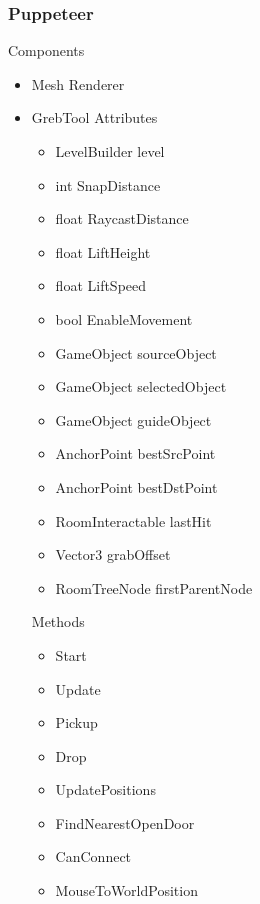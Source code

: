 \documentclass[11pt]{article}
\begin{document}
\subsubsection{Puppeteer}
Components
\begin{itemize}
	\item Mesh Renderer
	\item GrebTool
	\newline Attributes
	\begin{itemize}
		\item LevelBuilder level
		\item int SnapDistance
		\item float RaycastDistance
		\item float LiftHeight
		\item float LiftSpeed
		\item bool EnableMovement
		\item GameObject sourceObject
		\item GameObject selectedObject
		\item GameObject guideObject
		\item AnchorPoint bestSrcPoint
		\item AnchorPoint bestDstPoint
		\item RoomInteractable lastHit
		\item Vector3 grabOffset
		\item RoomTreeNode firstParentNode
	\end{itemize}
	Methods
	\begin{itemize}
		\item Start
		\item Update
		\item Pickup
		\item Drop
		\item UpdatePositions
		\item FindNearestOpenDoor
		\item CanConnect
		\item MouseToWorldPosition
	\end{itemize}
\end{itemize}
\end{document}
